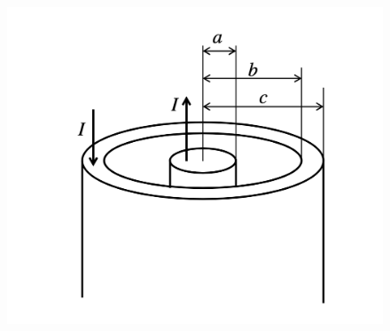 \documentclass[dvipdfmx]{ujarticle}
\begin{document}
\begin{figure}[h]
	\centering
	\includegraphics[scale=0.35]{./fig/R03_fig1.png}
	\caption{}
	\label{fig:1}
\end{figure}
\end{document}
